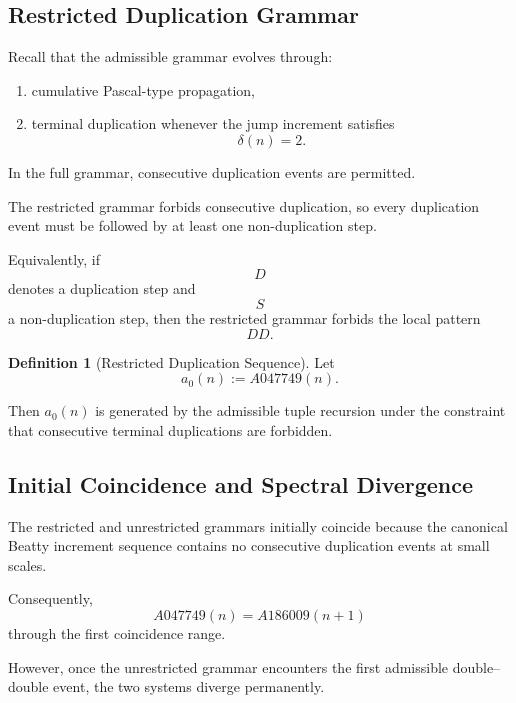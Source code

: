 \documentclass[12pt, oneside]{article}
\numberwithin{equation}{section}
\theoremstyle{definition}
\newtheorem{definition}{Definition}[section]
\theoremstyle{plain}
\theoremstyle{remark}
\begin{document}

\subsection{Restricted Duplication Grammar}

Recall that the admissible grammar evolves through:
\begin{enumerate}
\item cumulative Pascal-type propagation,
\item terminal duplication whenever the jump increment satisfies
\[
\delta(n)=2.
\]
\end{enumerate}

In the full grammar, consecutive duplication events are permitted.

The restricted grammar forbids consecutive duplication, so every
duplication event must be followed by at least one non-duplication step.

Equivalently, if
\[
D
\]
denotes a duplication step and
\[
S
\]
a non-duplication step, then the restricted grammar forbids the local
pattern
\[
DD.
\]


\begin{definition}[Restricted Duplication Sequence]
Let
\[
a_0(n):=A047749(n).
\]

Then \(a_0(n)\) is generated by the admissible tuple recursion under
the constraint that consecutive terminal duplications are forbidden.
\end{definition}


\subsection{Initial Coincidence and Spectral Divergence}

The restricted and unrestricted grammars initially coincide because the
canonical Beatty increment sequence contains no consecutive duplication
events at small scales.

Consequently,
\[
A047749(n)=A186009(n+1)
\]
through the first coincidence range.

However, once the unrestricted grammar encounters the first admissible
double--double event, the two systems diverge permanently.
\end{document}
